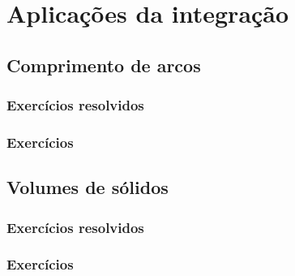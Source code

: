 
\chapter{Aplicações da integração}\label{cap:apl_integracao}

\emconstrucao

\section{Comprimento de arcos}
\construirSec

\subsection*{Exercícios resolvidos}

\construirExeresol


\subsection*{Exercícios}

\construirExer


\section{Volumes de sólidos}
\construirSec

\subsection*{Exercícios resolvidos}

\construirExeresol


\subsection*{Exercícios}

\construirExer




